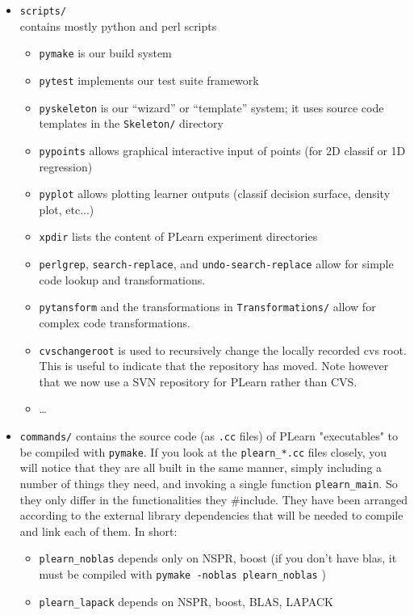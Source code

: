 \documentclass[11pt]{book}
\begin{document}
\begin{itemize}
\item \verb!scripts/! \\
contains mostly python and perl scripts
  \begin{itemize}
  \item {\tt pymake} is our build system 
  \item {\tt pytest} implements our test suite framework
  \item {\tt pyskeleton} is our ``wizard'' or ``template'' system;  it uses source code templates in the {\tt Skeleton/} directory
  \item {\tt pypoints} allows graphical interactive input of points (for 2D classif or 1D regression)
  \item {\tt pyplot} allows plotting learner outputs (classif decision surface, density plot, etc...) 
  \item {\tt xpdir} lists the content of PLearn experiment directories
  \item {\tt perlgrep}, {\tt search-replace}, and {\tt undo-search-replace} allow for simple code lookup and transformations.
  \item {\tt pytansform} and the transformations in {\tt Transformations/} allow for complex code transformations.
  \item {\tt cvschangeroot} is used to recursively change the locally
  recorded cvs root. This is useful to indicate that the repository has
  moved. Note however that we now use a SVN repository for PLearn rather
  than CVS.
  \item \ldots
  \end{itemize}
\item \verb!commands/! contains the source code (as {\tt .cc} files) of PLearn "executables" to be
compiled with {\tt pymake}. If you look at the \verb!plearn_*.cc! files closely, you will
notice that they are all built in the same manner, simply including a
number of things they need, and invoking a single function
\verb!plearn_main!. So they only differ in the functionalities they
\#include. They have been arranged according to the external
library dependencies that will be needed to compile and link each of them. In short:
\begin{itemize}
\item \verb!plearn_noblas!   depends only on NSPR, boost  (if you don't have blas, it must be compiled with \verb!pymake -noblas plearn_noblas! ) 
\item \verb!plearn_lapack!   depends on NSPR, boost, BLAS, LAPACK

\end{itemize}
\end{itemize}
\end{document}
